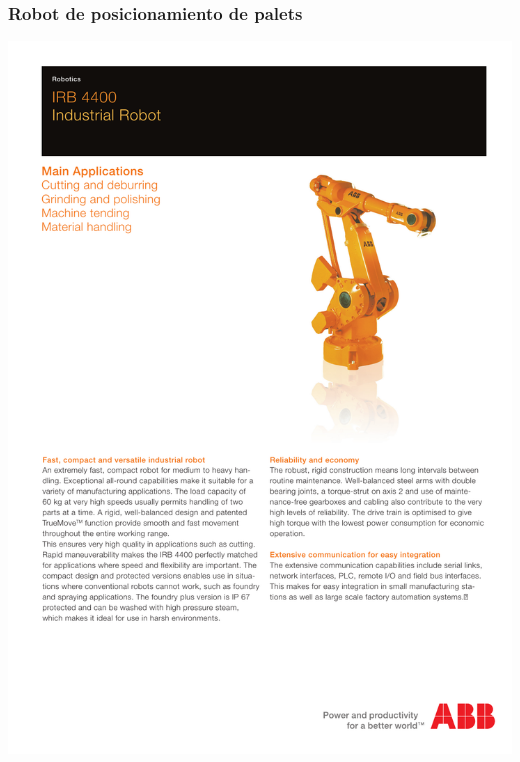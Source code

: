 \subsubsection{Robot de posicionamiento de palets}
\hspace*{-2cm}
\includegraphics[page=2]{Datasheets/IRB-4400.pdf}
\newpage

